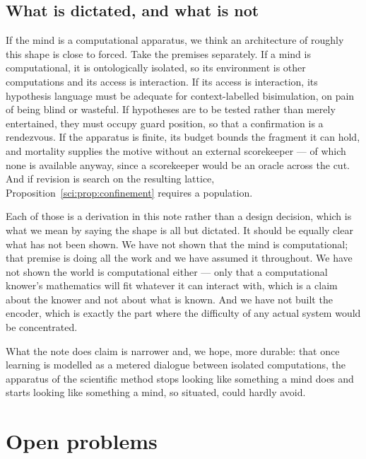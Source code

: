 \subsection{What is dictated, and what is not}\label{sci:S17.4}

If the mind is a computational apparatus, we think an architecture of roughly this shape is close to
forced. Take the premises separately. If a mind is computational, it is ontologically isolated, so its
environment is other computations and its access is interaction. If its access is interaction, its
hypothesis language must be adequate for context-labelled bisimulation, on pain of being blind or
wasteful. If hypotheses are to be tested rather than merely entertained, they must occupy guard
position, so that a confirmation is a rendezvous. If the apparatus is finite, its budget bounds the
fragment it can hold, and mortality supplies the motive without an external scorekeeper --- of which
none is available anyway, since a scorekeeper would be an oracle across the cut. And if revision is
search on the resulting lattice, Proposition~\ref{sci:prop:confinement} requires a population.

Each of those is a derivation in this note rather than a design decision, which is what we mean by
saying the shape is all but dictated. It should be equally clear what has not been shown. We have not
shown that the mind is computational; that premise is doing all the work and we have assumed it
throughout. We have not shown the world is computational either --- only that a computational knower's
mathematics will fit whatever it can interact with, which is a claim about the knower and not about
what is known. And we have not built the encoder, which is exactly the part where the difficulty of
any actual system would be concentrated.

What the note does claim is narrower and, we hope, more durable: that once learning is modelled as a
metered dialogue between isolated computations, the apparatus of the scientific method stops looking
like something a mind does and starts looking like something a mind, so situated, could hardly avoid.

\section{Open problems}\label{sci:S18}
\label{sci:sec:open}

